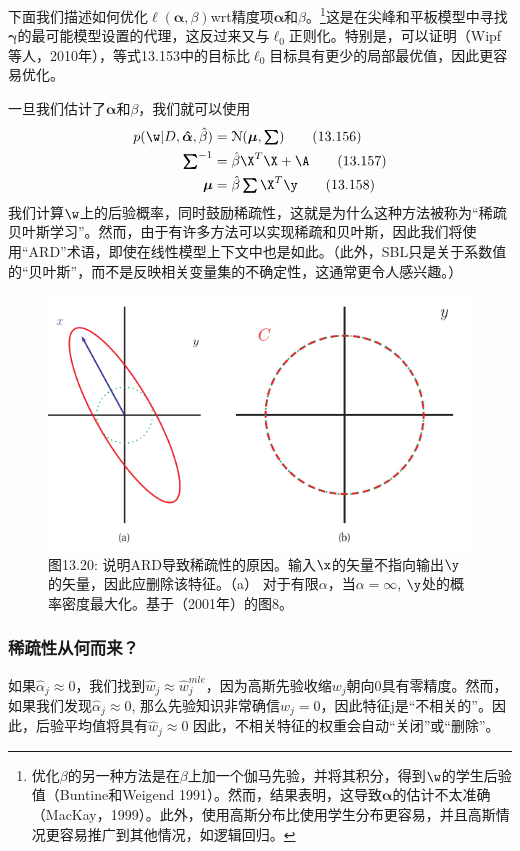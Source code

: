 \documentclass[a4paper]{article}
\begin{document}
下面我们描述如何优化$\ell(\boldsymbol{\alpha},\beta)$wrt精度项$\boldsymbol{\alpha}$和$\beta$。\footnote{优化$\beta$的另一种方法是在$\beta$上加一个伽马先验，并将其积分，得到$\w$的学生后验值（Buntine和Weigend 1991）。然而，结果表明，这导致$\boldsymbol{\alpha}$的估计不太准确（MacKay，1999）。此外，使用高斯分布比使用学生分布更容易，并且高斯情况更容易推广到其他情况，如逻辑回归。}这是在尖峰和平板模型中寻找$\boldsymbol{\gamma}$的最可能模型设置的代理，这反过来又与$\ell_0$正则化。特别是，可以证明（Wipf等人，2010年），等式13.153中的目标比$\ell_0$目标具有更少的局部最优值，因此更容易优化。

一旦我们估计了$\boldsymbol{\alpha}$和$\beta$，我们就可以使用
\begin{align}
	p(\w|D,\boldsymbol{\hat{\alpha}},\hat{\beta})&=\mathcal{N}(\boldsymbol{\mu},\boldsymbol{\textstyle \sum})\tag{13.156}\\
	\boldsymbol{\textstyle \sum}^{-1}&=\hat{\beta}\X^T\X+\A\tag{13.157}\\
	\boldsymbol{\mu}&=\hat{\beta}\boldsymbol{\textstyle \sum}\X^T\y\tag{13.158}
\end{align}
我们计算$\w$上的后验概率，同时鼓励稀疏性，这就是为什么这种方法被称为“稀疏贝叶斯学习”。然而，由于有许多方法可以实现稀疏和贝叶斯，因此我们将使用“ARD”术语，即使在线性模型上下文中也是如此。（此外，SBL只是关于系数值的“贝叶斯”，而不是反映相关变量集的不确定性，这通常更令人感兴趣。）

\begin{figure}[h]
	\centering
	\includegraphics[width=0.7\linewidth]{fig13/figure20}
	\caption*{图13.20: 说明ARD导致稀疏性的原因。输入$\x$的矢量不指向输出$\y$的矢量，因此应删除该特征。（a） 对于有限$\alpha$，当$\alpha=\infty$, $\y$处的概率密度最大化。基于（2001年）的图8。}
\end{figure}

\subsubsection{稀疏性从何而来？}
如果$\hat{\alpha}_j\approx 0$，我们找到$\hat{w}_j\approx \hat{w}_j^{mle}$，因为高斯先验收缩$w_j$朝向0具有零精度。然而，如果我们发现$\hat{\alpha}_j\approx 0$, 那么先验知识非常确信$w_j=0$，因此特征j是“不相关的”。因此，后验平均值将具有$\hat{w}_j\approx 0$ 因此，不相关特征的权重会自动“关闭”或“删除”。
\end{document}
